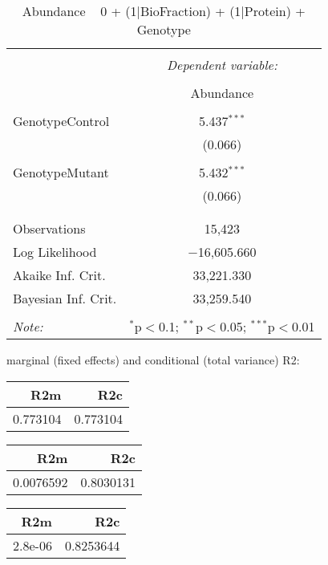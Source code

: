 \documentclass[11pt]{report}
\begin{document}
\begin{table}[!htbp] \centering 
  \caption{Abundance ~ 0 + (1|BioFraction) + (1|Protein) + Genotype} 
  \label{} 
\begin{tabular}{@{\extracolsep{5pt}}lc} 
\\[-1.8ex]\hline 
\hline \\[-1.8ex] 
 & \multicolumn{1}{c}{\textit{Dependent variable:}} \\ 
\cline{2-2} 
\\[-1.8ex] & Abundance \\ 
\hline \\[-1.8ex] 
 GenotypeControl & 5.437$^{***}$ \\ 
  & (0.066) \\ 
  & \\ 
 GenotypeMutant & 5.432$^{***}$ \\ 
  & (0.066) \\ 
  & \\ 
\hline \\[-1.8ex] 
Observations & 15,423 \\ 
Log Likelihood & $-$16,605.660 \\ 
Akaike Inf. Crit. & 33,221.330 \\ 
Bayesian Inf. Crit. & 33,259.540 \\ 
\hline 
\hline \\[-1.8ex] 
\textit{Note:}  & \multicolumn{1}{r}{$^{*}$p$<$0.1; $^{**}$p$<$0.05; $^{***}$p$<$0.01} \\ 
\end{tabular} 
\end{table} 
marginal (fixed effects) and conditional (total variance) R2:

\begin{tabular}{r|r}
\hline
R2m & R2c\\
\hline
0.773104 & 0.773104\\
\hline
\end{tabular}

\begin{tabular}{r|r}
\hline
R2m & R2c\\
\hline
0.0076592 & 0.8030131\\
\hline
\end{tabular}

\begin{tabular}{r|r}
\hline
R2m & R2c\\
\hline
2.8e-06 & 0.8253644\\
\hline
\end{tabular}
\end{document}
